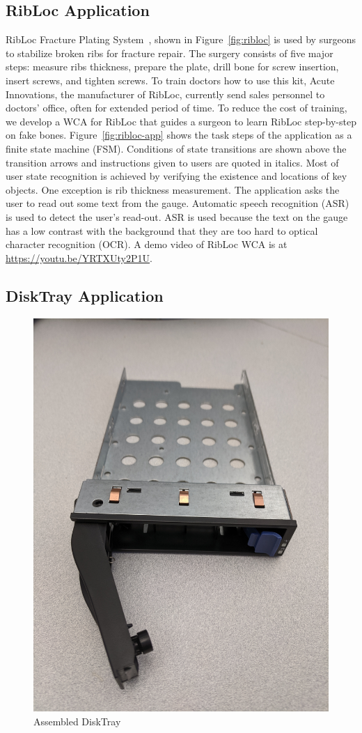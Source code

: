 \subsection{RibLoc Application}

RibLoc Fracture Plating System~\cite{ribloc}, shown in Figure~\ref{fig:ribloc}
is used by surgeons to stabilize broken ribs for fracture repair. The surgery
consists of five major steps: measure ribs thickness, prepare the plate, drill
bone for screw insertion, insert screws, and tighten screws. To train doctors
how to use this kit, Acute Innovations, the manufacturer of RibLoc, currently
send sales personnel to doctors' office, often for extended period of time. To
reduce the cost of training, we develop a WCA for RibLoc that guides a surgeon
to learn RibLoc step-by-step on fake bones. Figure~\ref{fig:ribloc-app} shows
the task steps of the application as a finite state machine (FSM). Conditions of
state transitions are shown above the transition arrows and instructions given
to users are quoted in italics. Most of user state recognition is achieved by
verifying the existence and locations of key objects. One exception is rib
thickness measurement. The application asks the user to read out some text from
the gauge. Automatic speech recognition (ASR) is used to detect the user's
read-out. ASR is used because the text on the gauge has a low contrast with the
background that they are too hard to optical character recognition (OCR). A demo
video of RibLoc WCA is at \url{https://youtu.be/YRTXUty2P1U}.

\subsection{DiskTray Application}

\begin{figure}
    \centering
    \includegraphics[width=0.3\linewidth]{FIGS/disktray.jpg}
    \caption{Assembled DiskTray}
    \label{fig:disktray}
\end{figure}

